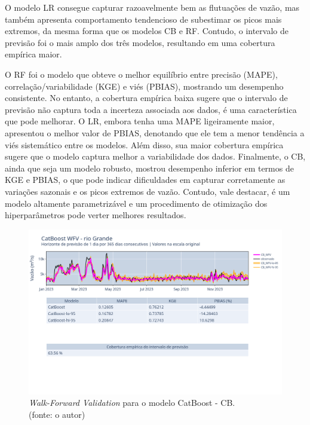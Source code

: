 O modelo LR consegue capturar razoavelmente bem as flutuações de vazão, mas também apresenta comportamento tendencioso de subestimar os picos mais extremos, da mesma forma que os modelos CB e RF. Contudo, o intervalo de previsão foi o mais amplo dos três modelos, resultando em uma cobertura empírica maior.

O RF foi o modelo que obteve o melhor equilíbrio entre precisão (MAPE), correlação/variabilidade (KGE) e viés (PBIAS), mostrando um desempenho consistente. No entanto, a cobertura empírica baixa sugere que o intervalo de previsão não captura toda a incerteza associada aos dados, é uma característica que pode melhorar. O LR, embora tenha uma MAPE ligeiramente maior, apresentou o melhor valor de PBIAS, denotando que ele tem a menor tendência a viés sistemático entre os modelos. Além disso, sua maior cobertura empírica sugere que o modelo captura melhor a variabilidade dos dados. Finalmente, o CB, ainda que seja um modelo robusto, mostrou desempenho inferior em termos de KGE e PBIAS, o que pode indicar dificuldades em capturar corretamente as variações sazonais e os picos extremos de vazão. Contudo, vale destacar, é um modelo altamente parametrizável e um procedimento de otimização dos hiperparâmetros pode verter melhores resultados.

\begin{figure}[!h]
	\centering
	\includegraphics[scale=0.33]{Figuras/rio_grande/wfv/CB/CB_WFV_ORIG.png}
	\caption{\textit{Walk-Forward Validation} para o modelo CatBoost - CB.\\(fonte: o autor)}
	\label{fig:grande_CB_WFV_ORIG}
\end{figure}

